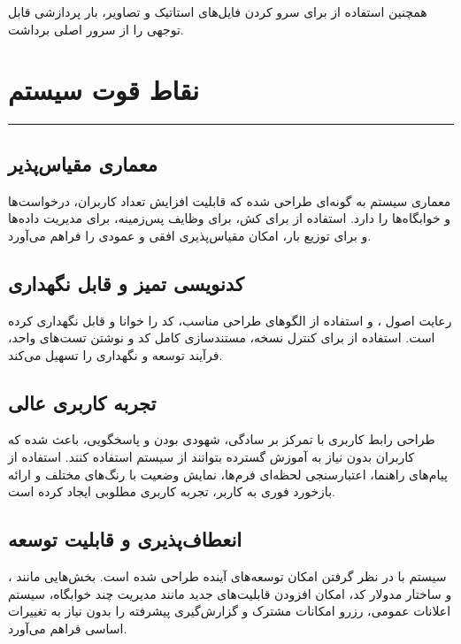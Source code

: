 \documentclass[12pt,a4paper]{report}
\begin{document}
	همچنین استفاده از  برای سرو کردن فایل‌های استاتیک و تصاویر، بار پردازشی قابل توجهی را از سرور اصلی برداشت.
	
	\section{نقاط قوت سیستم}
	\noindent\rule{\textwidth}{0.4pt}
	
	\subsection{معماری مقیاس‌پذیر}
	
	معماری سیستم به گونه‌ای طراحی شده که قابلیت افزایش تعداد کاربران، درخواست‌ها و خوابگاه‌ها را دارد. استفاده از  برای کش،  برای وظایف پس‌زمینه،  برای مدیریت داده‌ها و  برای توزیع بار، امکان مقیاس‌پذیری افقی و عمودی را فراهم می‌آورد.
	
	\subsection{کدنویسی تمیز و قابل نگهداری}
	
	رعایت اصول ،  و استفاده از الگوهای طراحی مناسب، کد را خوانا و قابل نگهداری کرده است. استفاده از  برای کنترل نسخه، مستندسازی کامل کد و نوشتن تست‌های واحد، فرآیند توسعه و نگهداری را تسهیل می‌کند.
	
	\subsection{تجربه کاربری عالی}
	
	طراحی رابط کاربری با تمرکز بر سادگی، شهودی بودن و پاسخگویی، باعث شده که کاربران بدون نیاز به آموزش گسترده بتوانند از سیستم استفاده کنند. استفاده از پیام‌های راهنما، اعتبارسنجی لحظه‌ای فرم‌ها، نمایش وضعیت با رنگ‌های مختلف و ارائه بازخورد فوری به کاربر، تجربه کاربری مطلوبی ایجاد کرده است.
	
	\subsection{انعطاف‌پذیری و قابلیت توسعه}
	
	سیستم با در نظر گرفتن امکان توسعه‌های آینده طراحی شده است. بخش‌هایی مانند ،  و ساختار مدولار کد، امکان افزودن قابلیت‌های جدید مانند مدیریت چند خوابگاه، سیستم اعلانات عمومی، رزرو امکانات مشترک و گزارش‌گیری پیشرفته را بدون نیاز به تغییرات اساسی فراهم می‌آورد.
	
\end{document}

